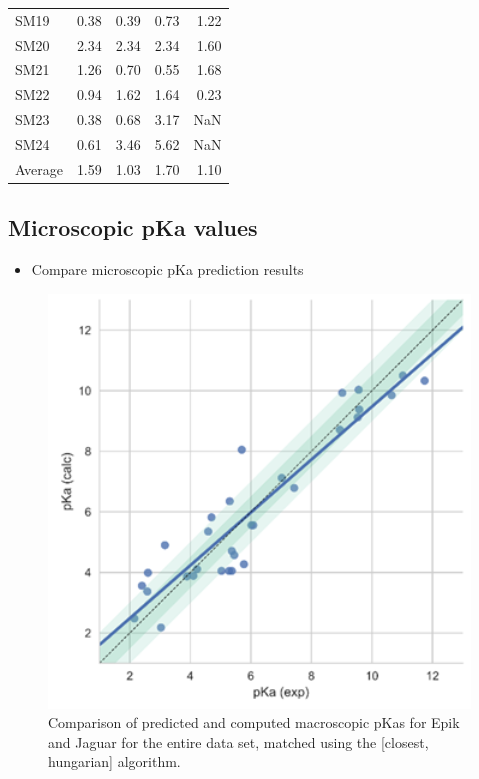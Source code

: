 \documentclass[9pt,lineno]{elife}
\begin{document}
\begin{table}[H]
\begin{tabular}{lrrrr}
    SM19 &       0.38 &        0.39 &         0.73 &         1.22 \\
    SM20 &       2.34 &        2.34 &         2.34 &         1.60 \\
    SM21 &       1.26 &        0.70 &         0.55 &         1.68 \\
    SM22 &       0.94 &        1.62 &         1.64 &         0.23 \\
    SM23 &       0.38 &        0.68 &         3.17 &         NaN \\
    SM24 &       0.61 &        3.46 &         5.62 &         NaN \\
    \midrule
    Average &       1.59 &        1.03 &         1.70 &         1.10 \\
\bottomrule\end{tabular}
    
\end{table}

\subsection{Microscopic pKa values}
\begin{itemize}
    \item Compare microscopic pKa prediction results
\end{itemize}
\begin{figure}[H]
    \centering
    \includegraphics[]{correlationplot.png}
    \caption{Comparison of predicted and computed macroscopic pKas for Epik and Jaguar for the entire data set, matched using the [closest, hungarian] algorithm.}
    \label{fig:correlation-micro}
\end{figure}
\end{document}
